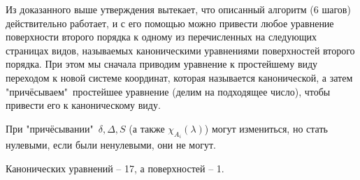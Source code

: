 \documentclass[a4paper, 12pt]{article}
\theoremstyle{definition}
\begin{document}
Из доказанного выше утверждения вытекает, что описанный алгоритм (6 шагов) действительно работает, и с его помощью можно привести любое уравнение поверхности второго порядка к одному из перечисленных на следующих страницах видов, называемых каноническими уравнениями поверхностей второго порядка.
При этом мы сначала приводим уравнение к простейшему виду переходом к новой системе координат, которая называется канонической, а затем "причёсываем"\ простейшее уравнение (делим на подходящее число), чтобы привести его к каноническому виду.

При "причёсывании"\ $\delta, \Delta, S$ (а также $\chi_{A_i} (\lambda)$) могут измениться, но стать нулевыми, если были ненулевыми, они не могут.

Канонических уравнений – 17, а поверхностей – 1.
\end{document}
